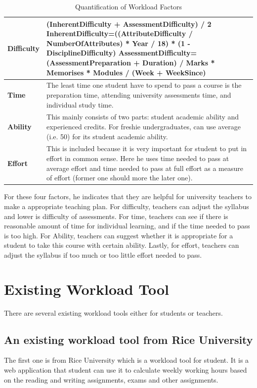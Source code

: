 \documentclass[fyp]{socreport}
\begin{document}
\begin{table}[]
\centering
\begin{tabular}{|p{}|p{}|}
\hline
\rowcolor[HTML]{E0E0E0}
\textbf{Difficulty} & \textbf{(InherentDifficulty + AssessmentDifficulty) / 2} \newline InherentDifficulty=((AttributeDifficulty / NumberOfAttributes) * Year / 18) * (1 - DisciplineDifficulty) \newline AssessmentDifficulty=(AssessmentPreparation + Duration) / Marks * Memorises * Modules / (Week + WeekSince) \\
\hline
\textbf{Time} & The least time one student have to spend to pass a course is the preparation time, attending university assessments time, and individual study time. \\
\hline
\rowcolor[HTML]{E0E0E0}
\textbf{Ability} & This mainly consists of two parts: student academic ability and experienced credits. For freshie undergraduates, can use average (i.e. 50) for its student academic ability. \\
\hline
\textbf{Effort} & This is included because it is very important for student to put in effort in common sense. Here he uses time needed to pass at average effort and time needed to pass at full effort as a measure of effort (former one should more the later one). \\
\hline
\end{tabular}
\caption{Quantification of Workload Factors}
\label{factor-table}
\end{table}

For these four factors, he indicates that they are helpful for university teachers to make a appropriate teaching plan. For difficulty, teachers can adjust the syllabus and lower is difficulty of assessments. For time, teachers can see if there is reasonable amount of time for individual learning, and if the time needed to pass is too high. For Ability, teachers can suggest whether it is appropriate for a student to take this course with certain ability. Lastly, for effort, teachers can adjust the syllabus if too much or too little effort needed to pass.

\section{Existing Workload Tool}
There are several existing workload tools either for students or teachers.

\subsection{An existing workload tool from Rice University}
The first one is from Rice University which is a workload tool for student. It is a web application that student can use it to calculate weekly working hours based on the reading and writing assignments, exams and other assignments.
\end{document}
